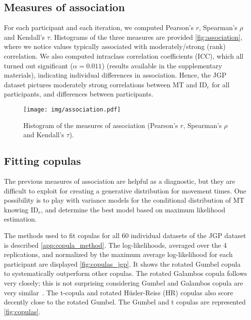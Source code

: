 \documentclass[manuscript,review,anonymous]{acmart}
\newcommand{\ide}{\ensuremath{{\text{ID}_e}}\xspace}
\begin{document}



\subsection{Measures of association}

For each participant and each iteration, we computed Pearson's $r$, Spearman's $\rho$ and Kendall's $\tau$. Histograms of the three measures are provided \autoref{fig:association}, where we notice values typically associated with moderately/strong (rank) correlation. We also computed intraclass correlation coefficients (ICC), which all turned out significant ($\alpha=0.011$) (results available in the supplementary materials), indicating individual differences in association.
Hence, the JGP dataset pictures moderately strong correlations between MT and \ide for all participants, and differences between participants.
\begin{figure}[htbp]
	\centering
	\texttt{[image: img/association.pdf]}
	\caption{Histogram of the measures of association (Pearson's $r$, Spearman's $\rho$ and Kendall's $\tau$).}
	\label{fig:association}
\end{figure}


\subsection{Fitting copulas \label{sub:jgp::fit_copula}}
The previous measures of association are helpful as a diagnostic, but they are difficult to exploit for creating a generative distribution for movement times. One possibility is to play with variance models for the conditional distribution of MT knowing \ide, and determine the best model based on maximum likelihood estimation.%

The methods used to fit copulas for all 60 individual datasets of the JGP dataset is described \autoref{app:copula_method}. The log-likelihoods, averaged over the 4 replications, and normalized by the maximum average log-likelihood for each participant are displayed \autoref{fig:copulas_jgp}. It shows the rotated Gumbel copula to systematically outperform other copulas. The rotated Galambos copula follows very closely; this is not surprising considering Gumbel and Galambos copula are very similar~\cite{genest2017}. The t-copula and rotated Hüsler-Reiss (HR) copulas also score decently close to the rotated Gumbel. The Gumbel and t copulas are represented \autoref{fig:copulas}.
\end{document}
